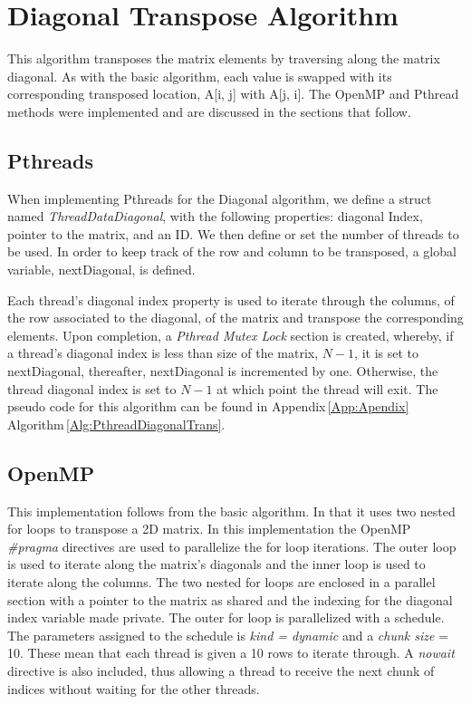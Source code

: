 \documentclass[10pt, onecolumn]{article}
\begin{document}
\section{Diagonal Transpose Algorithm}
%
This algorithm transposes the matrix elements by traversing along the matrix diagonal. As with the basic algorithm, each value is swapped with its corresponding transposed location, A[i, j] with A[j, i]. The OpenMP and Pthread methods were implemented and are discussed in the sections that follow. 
%
\subsection{Pthreads}
%
When implementing Pthreads for the Diagonal algorithm, we define a struct named \emph{ThreadDataDiagonal}, with the following properties: diagonal Index, pointer to the matrix, and an ID. We then define or set the number of threads to be used. In order to keep track of the row and column to be transposed, a global variable, nextDiagonal, is defined.

\noindent Each thread's diagonal index property is used to iterate through the columns, of the row associated to the diagonal, of the matrix and transpose the corresponding elements. Upon completion, a \emph{Pthread Mutex Lock} section is created, whereby, if a thread's diagonal index is less than size of the matrix, $N-1$, it is set to nextDiagonal, thereafter, nextDiagonal is incremented by one. Otherwise, the thread diagonal index is set to $N-1$ at which point the thread will exit. The pseudo code for this algorithm can be found in Appendix\,\ref{App:Apendix} Algorithm\,\ref{Alg:PthreadDiagonalTrans}.
%
\subsection{OpenMP}
%
This implementation follows from the basic algorithm. In that it uses two nested for loops to transpose a 2D matrix. In this implementation the OpenMP \emph{\#pragma} directives are used to parallelize the for loop iterations. The outer loop is used to iterate along the matrix's diagonals and the inner loop is used to iterate along the columns. The two nested for loops are enclosed in a parallel section with a pointer to the matrix as shared and the indexing for the diagonal index variable made private. The outer for loop is parallelized with a schedule. The parameters assigned to the schedule is \emph{kind = dynamic} and a \emph{chunk size} = 10. These mean that each thread is given a 10 rows to iterate through. A \emph{nowait} directive is also included, thus allowing a thread to receive the next chunk of indices without waiting for the other threads.
%
\end{document}
